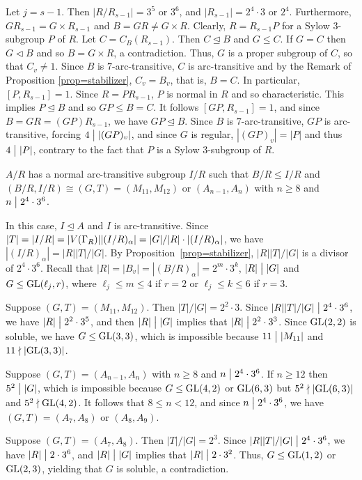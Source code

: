 \documentclass[12pt]{article}
\def\a{\alpha} \def\b{\beta} \def\g{\gamma} \def\d{\delta} \def\e{\varepsilon}
\def\di{\bigm|} \def\lg{\langle} \def\rg{\rangle}
\def\f{\noindent}
\begin{document}
Let $j=s-1$. Then $|R/R_{s-1}|=3^5$ or $3^6$, and $|R_{s-1}|=2^4\cdot 3$ or $2^4$. Furthermore, $GR_{s-1}=G\times R_{s-1}$ and $B=GR\not=G\times R$. Clearly, $R=R_{s-1}P$ for a Sylow $3$-subgroup $P$ of $R$. Let $C=C_B(R_{s-1})$. Then $C\unlhd B$ and $G\leq C$. If $G=C$ then $G\lhd B$ and so $B= G\times R$, a contradiction. Thus, $G$ is a proper subgroup of $C$, so that $C_v\not=1$. Since $B$ is $7$-arc-transitive, $C$ is arc-transitive and by the Remark of Proposition \ref{prop=stabilizer}, $C_v=B_v$, that is, $B=C$.
In particular, $[P,R_{s-1}]=1$. Since $R=PR_{s-1}$, $P$ is normal in $R$ and so characteristic. This implies $P\unlhd B$ and so $GP\leq B=C$. It follows $[GP,R_{s-1}]=1$, and since $B=GR=(GP)R_{s-1}$, we have $GP \unlhd B$. Since $B$ is $7$-arc-transitive, $GP$ is arc-transitive, forcing $4\di |(GP)_v|$, and since $G$ is regular, $|(GP)_v|=|P|$ and thus $4\di |P|$, contrary to the fact that $P$ is a Sylow $3$-subgroup of $R$.

\medskip
\f {\bf Case 2:} $A/R$ has a normal arc-transitive subgroup $I/R$ such that $B/R\leq I/R$ and $(B/R,I/R) \cong (G,T)= (M_{11},M_{12})$ or $(A_{n-1},A_n)$ with $n\geq 8$ and $n\di 2^4\cdot 3^6$.

In this case, $I\unlhd A$ and $I$ is arc-transitive. Since $|T|=|I/R|=|V(\G_R)||(I/R)_\a|=|G|/|R|\cdot |(I/R)_\a|$,  we have $|(I/R)_\a|=|R||T|/|G|$. By Proposition~\ref{prop=stabilizer}, $|R||T|/|G|$ is a divisor of $2^4\cdot 3^6$. Recall that $|R|=|B_v|=|(B/R)_\a|=2^m\cdot 3^k$, $|R|\di |G|$ and $G\leq \hbox{\rm GL}(\ell_j,r)$, where $\ell_j\leq m\leq 4$ if $r=2$ or $\ell_j\leq k\leq 6$ if $r=3$.

Suppose $(G,T)=(M_{11},M_{12})$. Then $|T|/|G|=2^2\cdot 3$. Since $|R||T|/|G|\di 2^4\cdot3^6$, we have $|R|\di 2^2\cdot3^5$, and then $|R|\di |G|$ implies that $|R|\di 2^2\cdot3^3$. Since $\hbox{\rm GL}(2,2)$ is soluble, we have  $G\leq \hbox{\rm GL}(3,3)$, which is impossible because $11\di |M_{11}|$ and $11\nmid |\hbox{\rm GL}(3,3)|$.

Suppose $(G,T)=(A_{n-1},A_n)$ with $n\geq 8$ and $n\di 2^4\cdot 3^6$.  If $n\geq 12$ then $5^2\di |G|$, which is impossible because $G\leq \hbox{\rm GL}(4,2)$ or $\hbox{\rm GL}(6,3)$ but $5^2\nmid |\hbox{\rm GL}(6,3)|$ and $5^2\nmid \hbox{\rm GL}(4,2)$. It follows \textcolor[rgb]{1,0,0}{that} $8\leq n<12$, and since $n\di 2^4\cdot 3^6$, we have  $(G,T)=(A_7,A_8)$ or  $(A_8,A_9)$.

Suppose $(G,T)=(A_7,A_8)$. Then $|T|/|G|=2^3$. Since $|R||T|/|G|\di 2^4\cdot3^6$, we have $|R|\di 2\cdot3^6$, and $|R|\di |G|$ implies that $|R|\di 2\cdot3^2$. Thus, $G\leq \hbox{\rm GL}(1,2)$ or $\hbox{\rm GL}(2,3)$, yielding that $G$ is soluble, a contradiction.
\end{document}
